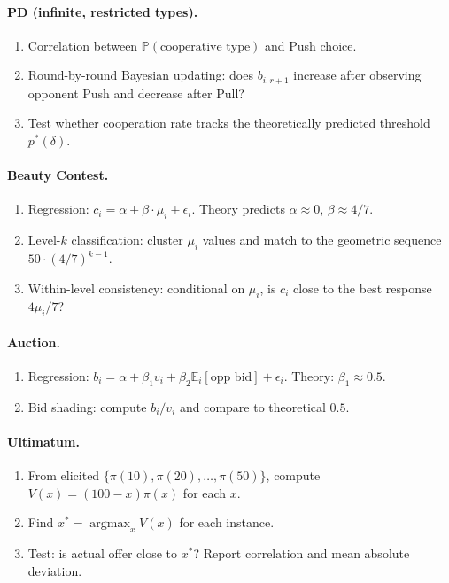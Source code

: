 \documentclass[12pt]{article}
\newcommand{\E}{\mathbb{E}}
\newcommand{\Prob}{\mathbb{P}}
\newcommand{\argmax}{\operatorname{argmax}}
\begin{document}
\paragraph{PD (infinite, restricted types).}
\begin{enumerate}[nosep]
    \item Correlation between $\Prob(\text{cooperative type})$ and Push choice.
    \item Round-by-round Bayesian updating: does $b_{i,r+1}$ increase after observing opponent Push and decrease after Pull?
    \item Test whether cooperation rate tracks the theoretically predicted threshold $p^*(\delta)$.
\end{enumerate}

\paragraph{Beauty Contest.}
\begin{enumerate}[nosep]
    \item Regression: $c_i = \alpha + \beta \cdot \mu_i + \epsilon_i$. Theory predicts $\alpha \approx 0$, $\beta \approx 4/7$.
    \item Level-$k$ classification: cluster $\mu_i$ values and match to the geometric sequence $50 \cdot (4/7)^{k-1}$.
    \item Within-level consistency: conditional on $\mu_i$, is $c_i$ close to the best response $4\mu_i/7$?
\end{enumerate}

\paragraph{Auction.}
\begin{enumerate}[nosep]
    \item Regression: $b_i = \alpha + \beta_1 v_i + \beta_2 \E_i[\text{opp bid}] + \epsilon_i$. Theory: $\beta_1 \approx 0.5$.
    \item Bid shading: compute $b_i / v_i$ and compare to theoretical $0.5$.
\end{enumerate}

\paragraph{Ultimatum.}
\begin{enumerate}[nosep]
    \item From elicited $\{\pi(10), \pi(20), \ldots, \pi(50)\}$, compute $V(x) = (100-x)\pi(x)$ for each $x$.
    \item Find $x^* = \argmax_x V(x)$ for each instance.
    \item Test: is actual offer close to $x^*$? Report correlation and mean absolute deviation.
\end{enumerate}
\end{document}
